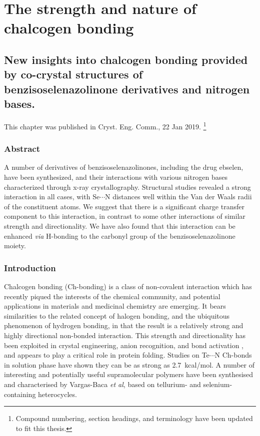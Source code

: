 \part{The strength and nature of chalcogen bonding}

\chapter[Insights from co-crystal structures]{New insights into chalcogen bonding provided by co-crystal structures of benzisoselenazolinone derivatives and nitrogen bases.}

This chapter was published in Cryst. Eng. Comm., 22 Jan 2019\autocite{Fellowes2019}. \footnote{Compound numbering, section headings, and terminology have been updated to fit this thesis.}

\section{Abstract}
A number of derivatives of benzisoselenazolinones, including the drug ebselen, have been synthesized, and their interactions with various nitrogen bases characterized through x-ray crystallography.
Structural studies revealed a strong interaction in all cases, with Se$\cdots$N distances well within the Van der Waals radii of the constituent atoms.
We suggest that there is a significant charge transfer component to this interaction, in contrast to some other interactions of similar strength and directionality.
We have also found that this interaction can be enhanced \emph{via} H-bonding to the carbonyl group of the benzisoselenazolinone moiety.


\section{Introduction}
Chalcogen bonding (Ch-bonding) is a class of non-covalent interaction which has recently piqued the interests of the chemical community, and potential applications in materials and medicinal chemistry are emerging.\autocite{Mitchell2017,Wonner2017a,Fanfrlik2014,Vogel2019}
It bears similarities to the related concept of halogen bonding, and the ubiquitous phenomenon of hydrogen bonding, in that the result is a relatively strong and highly directional non-bonded interaction.\autocite{Paolo1974}
This strength and directionality has been exploited in crystal engineering\autocite{Gleiter2003,Kremer2016,Huynh2017}, anion recognition\autocite{Lim2017,Lim2018,Garrett2016}, and bond activation \autocite{Wonner2017,Benz2017,Benz2017a}, and appears to play a critical role in protein folding\autocite{Iwaoka2001,Iwaoka2015}.
Studies on Te$\cdots$N Ch-bonds in solution phase have shown they can be as strong as 2.7~kcal/mol\autocite{Garrett2015a}.
A number of interesting and potentially useful supramolecular polymers have been synthesised and characterised by Vargas-Baca \emph{et al}, based on tellurium- and selenium-containing heterocycles\autocite{Ho2016,Ho2017}.

